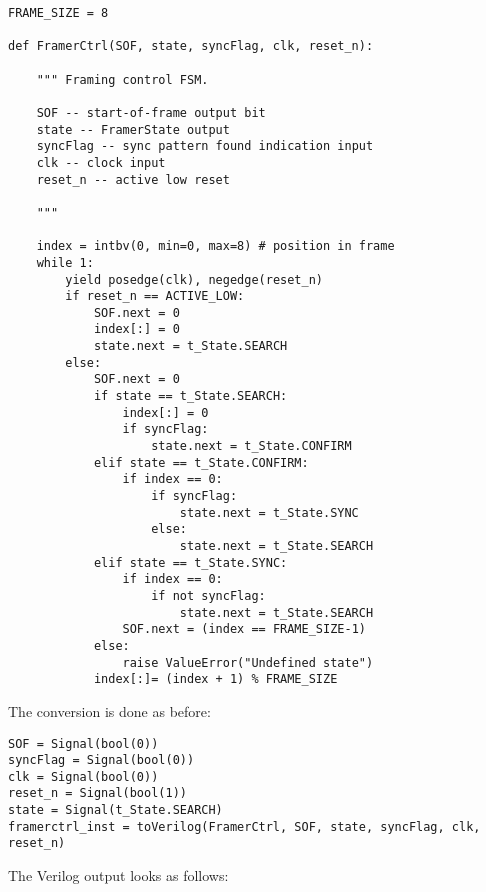 \begin{verbatim}
FRAME_SIZE = 8

def FramerCtrl(SOF, state, syncFlag, clk, reset_n):
    
    """ Framing control FSM.

    SOF -- start-of-frame output bit
    state -- FramerState output
    syncFlag -- sync pattern found indication input
    clk -- clock input
    reset_n -- active low reset
    
    """
    
    index = intbv(0, min=0, max=8) # position in frame
    while 1:
        yield posedge(clk), negedge(reset_n)
        if reset_n == ACTIVE_LOW:
            SOF.next = 0
            index[:] = 0
            state.next = t_State.SEARCH
        else:
            SOF.next = 0
            if state == t_State.SEARCH:
                index[:] = 0
                if syncFlag:
                    state.next = t_State.CONFIRM
            elif state == t_State.CONFIRM:
                if index == 0:
                    if syncFlag:
                        state.next = t_State.SYNC
                    else:
                        state.next = t_State.SEARCH
            elif state == t_State.SYNC:
                if index == 0:
                    if not syncFlag:
                        state.next = t_State.SEARCH
                SOF.next = (index == FRAME_SIZE-1)
            else:
                raise ValueError("Undefined state")
            index[:]= (index + 1) % FRAME_SIZE

\end{verbatim}

The conversion is done as before:

\begin{verbatim}
SOF = Signal(bool(0))
syncFlag = Signal(bool(0))
clk = Signal(bool(0))
reset_n = Signal(bool(1))
state = Signal(t_State.SEARCH)
framerctrl_inst = toVerilog(FramerCtrl, SOF, state, syncFlag, clk, reset_n)
\end{verbatim}

The Verilog output looks as follows:

